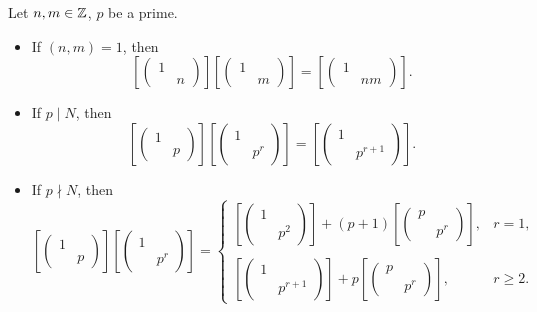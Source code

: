 \begin{proposition}\label{multiplication formula for diag (1 n)}
    Let $n, m\in\mathbb{Z}$, $p$ be a prime.
    \begin{itemize}
        \item If $(n, m) = 1$, then \[\left[ \begin{pmatrix}
            1&\\ & n
        \end{pmatrix} \right]\left[ \begin{pmatrix}
            1&\\ & m
        \end{pmatrix} \right] = \left[ \begin{pmatrix}
            1&\\ & nm
        \end{pmatrix} \right].\]
        \item If $p\mid N$, then
        \[\left[ \begin{pmatrix}
            1&\\ & p
        \end{pmatrix} \right]\left[ \begin{pmatrix}
            1&\\ & p^r
        \end{pmatrix} \right] = \left[ \begin{pmatrix}
            1&\\ & p^{r+1}
        \end{pmatrix} \right].\]

        \item If $p\nmid N$, then
        \[\left[ \begin{pmatrix}
            1&\\ & p
        \end{pmatrix} \right]\left[ \begin{pmatrix}
            1&\\ & p^r
        \end{pmatrix} \right] = \begin{cases}
            \left[ \begin{pmatrix}
            1&\\ & p^{2}
        \end{pmatrix} \right] + (p+1)\left[ \begin{pmatrix}
            p&\\ & p^r
        \end{pmatrix} \right], & r = 1,\\
        & \\
        \left[ \begin{pmatrix}
            1&\\ & p^{r + 1}
        \end{pmatrix} \right]+ p\left[ \begin{pmatrix}
            p&\\ &p^r
        \end{pmatrix} \right], & r\ge 2.
        \end{cases} \]
    \end{itemize}
\end{proposition}
